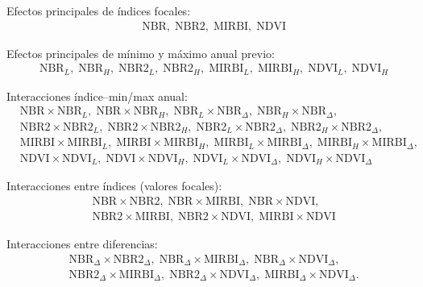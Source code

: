 \documentclass[11pt,a4paper]{article}
\begin{document}
\vspace{1em}

Efectos principales de índices focales:
\[
\begin{aligned}
&\mathrm{NBR},\;
\mathrm{NBR2},\;
\mathrm{MIRBI},\;
\mathrm{NDVI}
\end{aligned}
\]

Efectos principales de mínimo y máximo anual previo:
\[
\begin{aligned}
&\mathrm{NBR}_L,\;
\mathrm{NBR}_H,\;
\mathrm{NBR2}_L,\;
\mathrm{NBR2}_H,\;
\mathrm{MIRBI}_L,\;
\mathrm{MIRBI}_H,\;
\mathrm{NDVI}_L,\;
\mathrm{NDVI}_H
\end{aligned}
\]

Interacciones índice–min/max anual:
\[
\begin{aligned}
&\mathrm{NBR} \times \mathrm{NBR}_L,\;
\mathrm{NBR} \times \mathrm{NBR}_H,\;
\mathrm{NBR}_L \times \mathrm{NBR}_{\Delta},\;
\mathrm{NBR}_H \times \mathrm{NBR}_{\Delta}, \\
&\mathrm{NBR2} \times \mathrm{NBR2}_L,\;
\mathrm{NBR2} \times \mathrm{NBR2}_H,\;
\mathrm{NBR2}_L \times \mathrm{NBR2}_{\Delta},\;
\mathrm{NBR2}_H \times \mathrm{NBR2}_{\Delta}, \\
&\mathrm{MIRBI} \times \mathrm{MIRBI}_L,\;
\mathrm{MIRBI} \times \mathrm{MIRBI}_H,\;
\mathrm{MIRBI}_L \times \mathrm{MIRBI}_{\Delta},\;
\mathrm{MIRBI}_H \times \mathrm{MIRBI}_{\Delta}, \\
&\mathrm{NDVI} \times \mathrm{NDVI}_L,\;
\mathrm{NDVI} \times \mathrm{NDVI}_H,\;
\mathrm{NDVI}_L \times \mathrm{NDVI}_{\Delta},\;
\mathrm{NDVI}_H \times \mathrm{NDVI}_{\Delta}
\end{aligned}
\]

Interacciones entre índices (valores focales):
\[
\begin{aligned}
&\mathrm{NBR} \times \mathrm{NBR2},\;
\mathrm{NBR} \times \mathrm{MIRBI},\;
\mathrm{NBR} \times \mathrm{NDVI}, \\
&\mathrm{NBR2} \times \mathrm{MIRBI},\;
\mathrm{NBR2} \times \mathrm{NDVI},\;
\mathrm{MIRBI} \times \mathrm{NDVI}
\end{aligned}
\]

Interacciones entre diferencias:
\[
\begin{aligned}
&\mathrm{NBR}_{\Delta} \times \mathrm{NBR2}_{\Delta},\;
\mathrm{NBR}_{\Delta} \times \mathrm{MIRBI}_{\Delta},\;
\mathrm{NBR}_{\Delta} \times \mathrm{NDVI}_{\Delta}, \\
&\mathrm{NBR2}_{\Delta} \times \mathrm{MIRBI}_{\Delta},\;
\mathrm{NBR2}_{\Delta} \times \mathrm{NDVI}_{\Delta},\;
\mathrm{MIRBI}_{\Delta} \times \mathrm{NDVI}_{\Delta}.
\end{aligned}
\]
\end{document}
